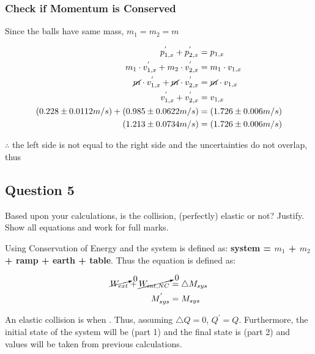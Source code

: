 \documentclass[12pt]{article}
\begin{document}
\pagebreak
\subsubsection{Check if Momentum is Conserved}
Since the balls have same mass, $m_{1} = m_{2} = m$

\begin{center}
\begin{align*}
p_{1,x}^{'} + p_{2,x}^{'} &= p_{1,x}\\
m_{1}\cdot{}v_{1,x}^{'} + m_{2}\cdot{}v_{2,x}^{'} &= m_{1}\cdot{}v_{1,x}\\
\cancel{m}\cdot{}v_{1,x}^{'} + \cancel{m}\cdot{}v_{2,x}^{'} &= \cancel{m}\cdot{}v_{1,x}\\
v_{1,x}^{'} + v_{2,x}^{'} &= v_{1,x}\\
(0.228\pm0.0112m/s) + (0.985\pm0.0622m/s) &= (1.726\pm0.006m/s)\\
(1.213\pm0.0734m/s) &= (1.726\pm0.006m/s)\\
\end{align*}
\end{center}

$\therefore{}$ the left side is not equal to the right side and the uncertainties do not overlap, thus 


\pagebreak
\subsection{Question 5}
Based upon your calculations, is the collision, (perfectly) elastic or not? Justify. Show all equations and work for full marks.

Using Conservation of Energy and the system is defined as: \textbf{system = $m_{1}$ + $m_{2}$ + ramp + earth + table}. Thus the equation is defined as:

\begin{center}\begin{align*}
\cancelto{0}{W_{ext}} + \cancelto{0}{W_{int, NC}} &= \triangle{M}_{sys}\\
M_{sys}^{'} &= M_{sys}\\
\end{align*}\end{center}

An elastic collision is when . Thus, assuming $\triangle{Q} = 0$, $Q^{'} = Q$. Furthermore, the initial state of the system will be (part 1) and the final state is (part 2) and values will be taken from previous calculations.
\end{document}
